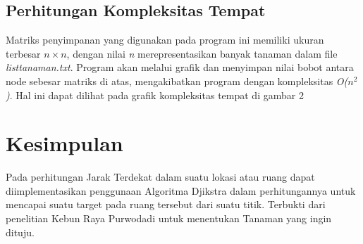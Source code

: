 \documentclass[conference]{IEEEtran}
\begin{document}
\subsection{Perhitungan Kompleksitas Tempat}
Matriks penyimpanan yang digunakan pada program ini memiliki ukuran terbesar $n \times n$, dengan nilai \textit{n} merepresentasikan banyak tanaman dalam ﬁle \textit{listtanaman.txt}. Program akan melalui graﬁk dan menyimpan nilai bobot antara node sebesar matriks di atas, mengakibatkan program dengan kompleksitas \textit{O($n^2$)}. Hal ini dapat dilihat pada graﬁk kompleksitas tempat di gambar 2

\section{Kesimpulan}
Pada perhitungan Jarak Terdekat dalam suatu lokasi atau ruang dapat diimplementasikan penggunaan Algoritma Djikstra dalam perhitungannya untuk mencapai suatu target pada ruang tersebut dari suatu titik. Terbukti dari penelitian Kebun Raya Purwodadi untuk menentukan Tanaman yang ingin dituju.
\end{document}
